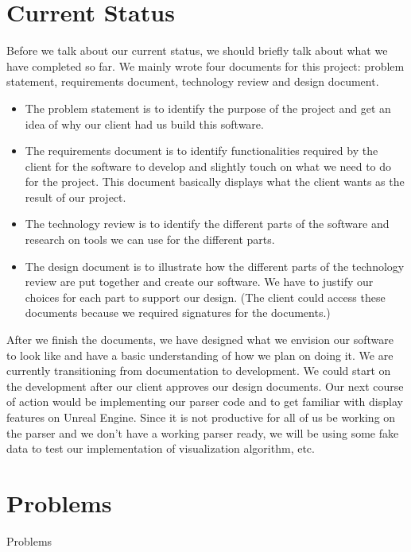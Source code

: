 \documentclass[onecolumn, draftclsnofoot, 10pt, compsoc]{IEEEtran}
\begin{document}
\section{Current Status}
\begin{singlespace}
Before we talk about our current status, we should briefly talk about what we have completed so far. We mainly wrote four documents for this project: problem statement, requirements document, technology review and design document.
\begin{itemize}
\item The problem statement is to identify the purpose of the project and get an idea of why our client had us build this software.
\item The requirements document is to identify functionalities required by the client for the software to develop and slightly touch on what we need to do for the project. This document basically displays what the client wants as the result of our project. 
\item The technology review is to identify the different parts of the software and research on tools we can use for the different parts.
\item The design document is to illustrate how the different parts of the technology review are put together and create our software. We have to justify our choices for each part to support our design. (The client could access these documents because we required signatures for the documents.)
\end{itemize}
 

After we finish the documents, we have designed what we envision our software to look like and have a basic understanding of how we plan on doing it. We are currently transitioning from documentation to development. We could start on the development after our client approves our design documents. Our next course of action would be implementing our parser code and to get familiar with display features on Unreal Engine. Since it is not productive for all of us be working on the parser and we don't have a working parser ready, we will be using some fake data to test our implementation of visualization algorithm, etc.
\end{singlespace}

\section{Problems}
\begin{singlespace}
Problems
\end{singlespace}
\end{document}
